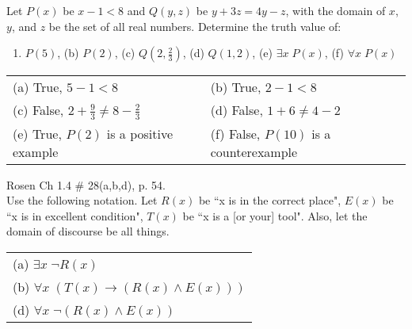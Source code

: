 \documentclass[10pt,addpoints]{exam}
\newcommand{\ra}{\rightarrow}
\begin{document}
\begin{questions}
\question[6] Let $P(x)$ be $x - 1 < 8$ and $Q(y,z)$ be $y + 3z = 4y - z$, with the domain of $x$, $y$, and $z$ be the set of all real numbers.  Determine the truth value of:
\begin{enumerate}[label=(\alph*),itemsep=0pt,parsep=0pt,
	topsep=0pt,partopsep=0pt]
    \item $P(5)$, \hspace{0.2in} (b) $P(2)$, \hspace{0.2in} (c) $Q(2, \frac{2}{3})$, 
    	\hspace{0.2in} (d) $Q(1, 2)$, \hspace{0.2in} (e) $\exists x\; P(x)$, \hspace{0.2in} (f) $\forall x\; P(x)$
\end{enumerate}
    \ifprintanswers
        \vspace{-12pt}
    \fi
	\begin{solution}
		\begin{tabular}{ll}
			(a) True, $5 - 1 < 8$  & (b) True,  $2 - 1 < 8$ \\
			(c) False, $ 2 + \frac{9}{3} \neq 8 - \frac{2}{3}$ & (d) False, $1 + 6 \neq 4 - 2$ \\ 
			(e) True, $P(2)$ is a positive example & (f) False, $P(10)$ is a counterexample 
		\end{tabular}
	\end{solution}


\question[6]\label{probA} Rosen Ch 1.4 \# 28(a,b,d), p. 54. \\
Use the following notation.  Let  $R(x)$ be ``x is in the correct place", $E(x)$ be ``x is in excellent condition",	$T(x)$ be ``x is a [or your] tool".
Also, let the domain of discourse be all things.
\ifprintanswers
        \vspace{-12pt}
    \fi
	\begin{solution}
	\begin{tabular}{l}
		(a) $\exists x\; \neg R(x)$ \\
		(b) $\forall x\; (T(x) \ra (R(x) \wedge E(x)))$ \\
		(d) $\forall x\; \neg (R(x) \wedge E(x))$ \\
	\end{tabular}
	\end{solution}



\end{questions}
\end{document}
